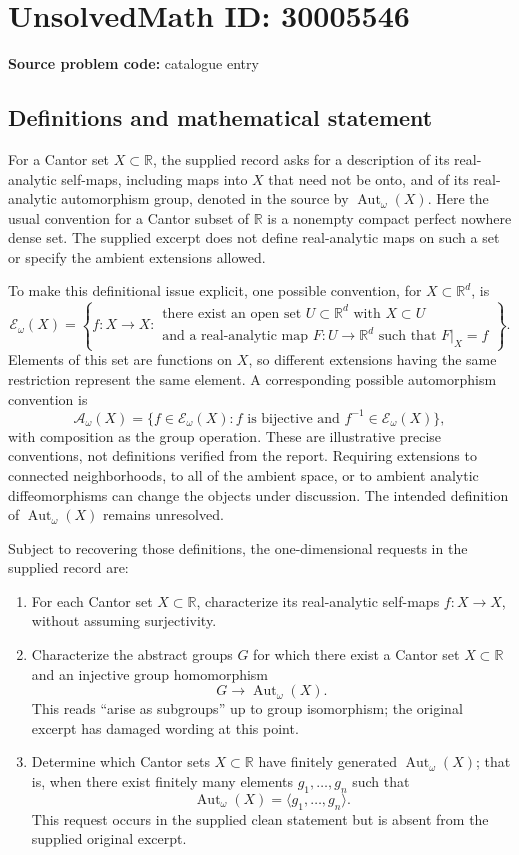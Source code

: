 \documentclass[11pt]{article}
\newcommand{\R}{\mathbb{R}}
\begin{document}
\section*{UnsolvedMath ID: 30005546}
\textbf{Source problem code:} catalogue entry
\subsection{Definitions and mathematical statement}
For a Cantor set \(X\subset\R\), the supplied record asks for a description of its real-analytic self-maps, including maps into \(X\) that need not be onto, and of its real-analytic automorphism group, denoted in the source by \(\operatorname{Aut}_{\omega}(X)\). Here the usual convention for a Cantor subset of \(\R\) is a nonempty compact perfect nowhere dense set. The supplied excerpt does not define real-analytic maps on such a set or specify the ambient extensions allowed.

To make this definitional issue explicit, one possible convention, for \(X\subset\R^d\), is
\[
\mathcal E_{\omega}(X)=\left\{f:X\to X:\begin{array}{l}\text{there exist an open set }U\subset\R^d\text{ with }X\subset U\\\text{and a real-analytic map }F:U\to\R^d\text{ such that }F|_X=f\end{array}\right\}.
\]
Elements of this set are functions on \(X\), so different extensions having the same restriction represent the same element. A corresponding possible automorphism convention is
\[
\mathcal A_{\omega}(X)=\{f\in\mathcal E_{\omega}(X): f\text{ is bijective and }f^{-1}\in\mathcal E_{\omega}(X)\},
\]
with composition as the group operation. These are illustrative precise conventions, not definitions verified from the report. Requiring extensions to connected neighborhoods, to all of the ambient space, or to ambient analytic diffeomorphisms can change the objects under discussion. The intended definition of \(\operatorname{Aut}_{\omega}(X)\) remains unresolved.

Subject to recovering those definitions, the one-dimensional requests in the supplied record are:
\begin{enumerate}
\item For each Cantor set \(X\subset\R\), characterize its real-analytic self-maps \(f:X\to X\), without assuming surjectivity.
\item Characterize the abstract groups \(G\) for which there exist a Cantor set \(X\subset\R\) and an injective group homomorphism
\[
G\longrightarrow\operatorname{Aut}_{\omega}(X).
\]
This reads ``arise as subgroups'' up to group isomorphism; the original excerpt has damaged wording at this point.
\item Determine which Cantor sets \(X\subset\R\) have finitely generated \(\operatorname{Aut}_{\omega}(X)\); that is, when there exist finitely many elements \(g_1,\ldots,g_n\) such that
\[
\operatorname{Aut}_{\omega}(X)=\langle g_1,\ldots,g_n\rangle.
\]
This request occurs in the supplied clean statement but is absent from the supplied original excerpt.
\end{enumerate}
\end{document}
